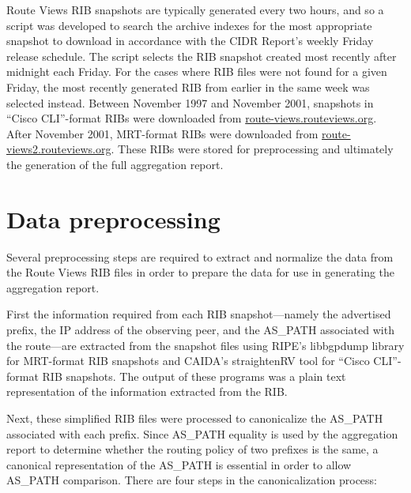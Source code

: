 Route Views RIB snapshots are typically generated every two hours, and so a script was developed to search the archive indexes for the most appropriate snapshot to download in accordance with the CIDR Report's weekly Friday release schedule. The script selects the RIB snapshot created most recently after midnight each Friday. For the cases where RIB files were not found for a given Friday, the most recently generated RIB from earlier in the same week was selected instead. Between November 1997 and November 2001, snapshots in ``Cisco CLI''-format RIBs were downloaded from \url{route-views.routeviews.org}. After November 2001, MRT-format RIBs were downloaded from \url{route-views2.routeviews.org}. These RIBs were stored for preprocessing and ultimately the generation of the full aggregation report.

\section{Data preprocessing}

Several preprocessing steps are required to extract and normalize the data from the Route Views RIB files in order to prepare the data for use in generating the aggregation report.

First the information required from each RIB snapshot---namely the advertised prefix, the IP address of the observing peer, and the AS\_PATH associated with the route---are extracted from the snapshot files using RIPE's libbgpdump library \cite{libbgpdump} for MRT-format RIB snapshots and CAIDA's straightenRV tool \cite{straightenrv} for ``Cisco CLI''-format RIB snapshots. The output of these programs was a plain text representation of the information extracted from the RIB.

Next, these simplified RIB files were processed to canonicalize the AS\_PATH associated with each prefix. Since AS\_PATH equality is used by the aggregation report to determine whether the routing policy of two prefixes is the same, a canonical representation of the AS\_PATH is essential in order to allow AS\_PATH comparison. There are four steps in the canonicalization process:

